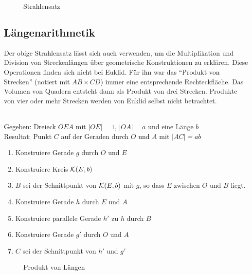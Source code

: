 \begin{figure}[h]
    
    \caption{Strahlensatz}
\end{figure}

\subsection*{Längenarithmetik}

Der obige Strahlensatz lässt sich auch verwenden, um die Multiplikation und Division von
Streckenlängen über geometrische Konstruktionen zu erklären. Diese Operationen finden sich nicht
bei Euklid. Für ihn war das "`Produkt von Strecken"' (notiert mit $AB \times CD$)
immer eine entsprechende Rechteckfläche. Das Volumen von Quadern entsteht dann als Produkt von drei
Strecken. Produkte von vier oder mehr Strecken werden von Euklid selbst nicht betrachtet.

\begin{konst}\ \\
    Gegeben: Dreieck $OEA$ mit $|OE|=1$, $|OA|=a$ und eine Länge $b$\\
    Resultat: Punkt $C$ auf der Geraden durch $O$ und $A$ mit $|AC|=ab$
    \renewcommand{\labelenumi}{\arabic{enumi}.} %
    \begin{enumerate}
        \item Konstruiere Gerade $g$ durch $O$ und $E$
        \item Konstruiere Kreis ${\mathcal K}(E,b)$
        \item $B$ sei der Schnittpunkt von ${\mathcal K}(E,b)$ mit $g$, so dass $E$ zwischen $O$ und $B$
            liegt.
        \item Konstruiere Gerade $h$ durch $E$ und $A$
        \item Konstruiere parallele Gerade $h'$ zu $h$ durch $B$
        \item Konstruiere Gerade $g'$ durch $O$ und $A$
        \item $C$ sei der Schnittpunkt von $h'$ und $g'$
    \end{enumerate}
\end{konst}

\begin{figure}[h]
    
    \caption{Produkt von Längen}
\end{figure}


